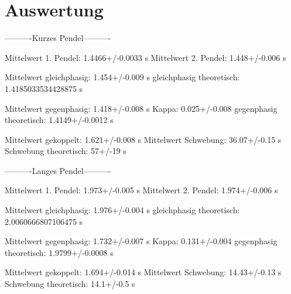 \section{Auswertung}
\label{sec:Auswertung}

----------Kurzes Pendel----------


Mittelwert 1. Pendel: 1.4466+/-0.0033 s
Mittelwert 2. Pendel: 1.448+/-0.006 s


Mittelwert gleichphasig: 1.454+/-0.009 s
gleichphasig theoretisch: 1.4185033534428875 s


Mittelwert gegenphasig: 1.418+/-0.008 s
Kappa: 0.025+/-0.008
gegenphasig theoretisch: 1.4149+/-0.0012 s


Mittelwert gekoppelt: 1.621+/-0.008 s
Mittelwert Schwebung: 36.07+/-0.15 s
Schwebung theoretisch: 57+/-19 s


----------Langes Pendel----------


Mittelwert 1. Pendel: 1.973+/-0.005 s
Mittelwert 2. Pendel: 1.974+/-0.006 s


Mittelwert gleichphasig: 1.976+/-0.004 s
gleichphasig theoretisch: 2.0060666807106475 s


Mittelwert gegenphasig: 1.732+/-0.007 s
Kappa: 0.131+/-0.004
gegenphasig theoretisch: 1.9799+/-0.0008 s


Mittelwert gekoppelt: 1.694+/-0.014 s
Mittelwert Schwebung: 14.43+/-0.13 s
Schwebung theoretisch: 14.1+/-0.5 s